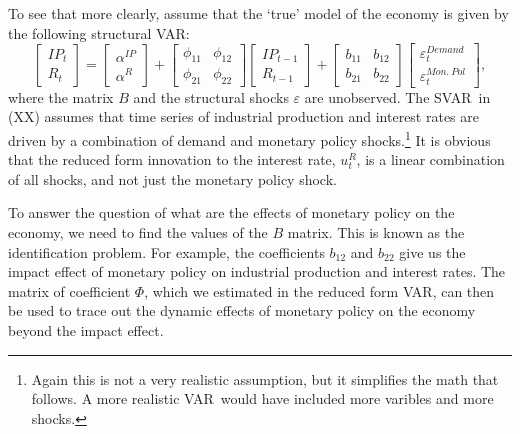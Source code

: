 \documentclass[10pt]{article}
\begin{document}
To see that more clearly, assume that the `true' model of the economy is
given by the following structural VAR:%
\begin{equation}
\begin{bmatrix}
IP_{t} \\ 
R_{t}%
\end{bmatrix}%
=%
\begin{bmatrix}
\alpha ^{IP} \\ 
\alpha ^{R}%
\end{bmatrix}%
+\left[ 
\begin{array}{cc}
\phi _{11} & \phi _{12} \\ 
\phi _{21} & \phi _{22}%
\end{array}%
\right] 
\begin{bmatrix}
IP_{t-1} \\ 
R_{t-1}%
\end{bmatrix}%
+\left[ 
\begin{array}{cc}
b_{11} & b_{12} \\ 
b_{21} & b_{22}%
\end{array}%
\right] 
\begin{bmatrix}
\varepsilon _{t}^{Demand} \\ 
\varepsilon _{t}^{Mon.\ Pol}%
\end{bmatrix}%
,  \label{eq:struct_2var}
\end{equation}%
where the matrix $B$ and the structural shocks $\varepsilon $ are
unobserved. The SVAR\ in (XX) assumes that time series of industrial
production and interest rates are driven by a combination of demand and
monetary policy shocks.\footnote{%
Again this is not a very realistic assumption, but it simplifies the math
that follows. A more realistic VAR\ would have included more varibles and
more shocks.} It is obvious that the reduced form innovation to the interest
rate, $u_{t}^{R}$, is a linear combination of all shocks, and not just the
monetary policy shock.

To answer the question of what are the effects of monetary policy on the
economy, we need to find the values of the $B$ matrix. This is known as the
identification problem. For example, the coefficients $b_{12}$ and $b_{22}$
give us the impact effect of monetary policy on industrial production and
interest rates. The matrix of coefficient $\Phi $, which we estimated in the
reduced form VAR, can then be used to trace out the dynamic effects of
monetary policy on the economy beyond the impact effect.
\end{document}
